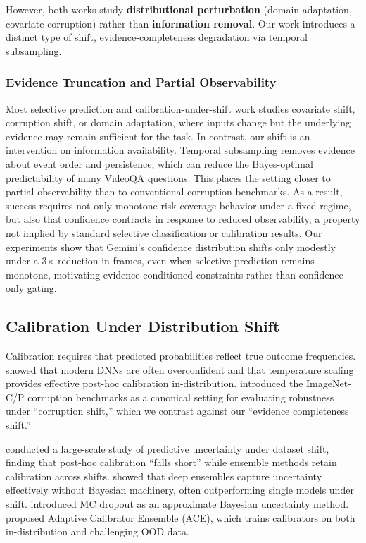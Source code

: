 \documentclass{article}
\begin{document}
However, both works study \textbf{distributional perturbation} (domain adaptation, covariate corruption) rather than \textbf{information removal}. Our work introduces a distinct type of shift, evidence-completeness degradation via temporal subsampling.

\subsubsection{Evidence Truncation and Partial Observability}

Most selective prediction and calibration-under-shift work studies covariate shift, corruption shift, or domain adaptation, where inputs change but the underlying evidence may remain sufficient for the task. In contrast, our shift is an intervention on information availability. Temporal subsampling removes evidence about event order and persistence, which can reduce the Bayes-optimal predictability of many VideoQA questions. This places the setting closer to partial observability than to conventional corruption benchmarks. As a result, success requires not only monotone risk-coverage behavior under a fixed regime, but also that confidence contracts in response to reduced observability, a property not implied by standard selective classification or calibration results. Our experiments show that Gemini's confidence distribution shifts only modestly under a 3$\times$ reduction in frames, even when selective prediction remains monotone, motivating evidence-conditioned constraints rather than confidence-only gating.

\subsection{Calibration Under Distribution Shift}

Calibration requires that predicted probabilities reflect true outcome frequencies. \citet{guo2017calibration} showed that modern DNNs are often overconfident and that temperature scaling provides effective post-hoc calibration in-distribution. \citet{hendrycks2019benchmarking} introduced the ImageNet-C/P corruption benchmarks as a canonical setting for evaluating robustness under ``corruption shift,'' which we contrast against our ``evidence completeness shift.''

\citet{ovadia2019uncertainty} conducted a large-scale study of predictive uncertainty under dataset shift, finding that post-hoc calibration ``falls short'' while ensemble methods retain calibration across shifts. \citet{lakshminarayanan2017ensembles} showed that deep ensembles capture uncertainty effectively without Bayesian machinery, often outperforming single models under shift. \citet{gal2016dropout} introduced MC dropout as an approximate Bayesian uncertainty method. \citet{zou2023adaptive} proposed Adaptive Calibrator Ensemble (ACE), which trains calibrators on both in-distribution and challenging OOD data.
\end{document}
